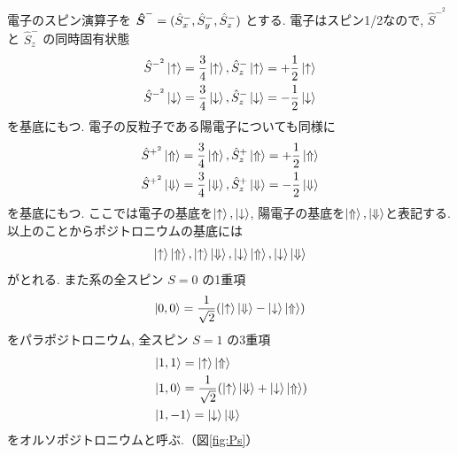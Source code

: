 電子のスピン演算子を
$\mbox{\boldmath $\hat{S}$}^{-} = (\hat{S}^{-}_{x},\hat{S}^{-}_{y},\hat{S}^{-}_{z})$
とする.
電子はスピン1/2なので,
$\hat{S}^{-^{2}}$
と
$\hat{S}^{-}_{z}$
の同時固有状態
\begin{equation}
\begin{split}
\hat{S}^{-^{2}} \ket{ \uparrow } = \frac{3}{4} \ket{ \uparrow },
\hat{S}^{-}_{z} \ket{ \uparrow } = + \frac{1}{2} \ket{ \uparrow } \\
\hat{S}^{-^{2}} \ket{ \downarrow } = \frac{3}{4} \ket{ \downarrow },
\hat{S}^{-}_{z} \ket{ \downarrow } = - \frac{1}{2} \ket{ \downarrow }
\end{split}
\label{eq:groundele}
\end{equation}
を基底にもつ.
電子の反粒子である陽電子についても同様に
\begin{equation}
\begin{split}
\hat{S}^{+^{2}} \ket{ \Uparrow } = \frac{3}{4} \ket{ \Uparrow },
\hat{S}^{+}_{z} \ket{ \Uparrow } = + \frac{1}{2} \ket{ \Uparrow } \\
\hat{S}^{+^{2}} \ket{ \Downarrow } = \frac{3}{4} \ket{ \Downarrow },
\hat{S}^{+}_{z} \ket{ \Downarrow } = - \frac{1}{2} \ket{ \Downarrow }
\end{split}
\label{eq:groundeposi}
\end{equation}
を基底にもつ.
ここでは電子の基底を$\ket{ \uparrow },\ket{ \downarrow }$,
陽電子の基底を$\ket{ \Uparrow },\ket{ \Downarrow }$と表記する.
以上のことからポジトロニウムの基底には
\begin{equation}
	\nonumber
\ket{ \uparrow } \ket{ \Uparrow },\ket{ \uparrow } \ket{ \Downarrow },
\ket{ \downarrow } \ket{ \Uparrow },\ket{ \downarrow } \ket{ \Downarrow }
\end{equation}
がとれる.
また系の全スピン $S = 0$ の1重項
\begin{equation}
\ket{0,0} = \frac{1}{\sqrt{2}} ( \ket{ \uparrow } \ket{ \Downarrow } - \ket{ \downarrow } \ket{ \Uparrow })
\label{eq:para}
\end{equation}
をパラポジトロニウム,
全スピン $S = 1$ の3重項
\begin{equation}
\begin{split}
&\ket{1,1} = \ket{ \uparrow } \ket{ \Uparrow } \\
&\ket{1,0} = \frac{1}{\sqrt{2}} ( \ket{ \uparrow } \ket{ \Downarrow } + \ket{ \downarrow } \ket{ \Uparrow }) \\
&\ket{1,-1} = \ket{ \downarrow } \ket{ \Downarrow }
\end{split}
\label{eq:ortho}
\end{equation}
をオルソポジトロニウムと呼ぶ.（図\ref{fig:Ps}）

